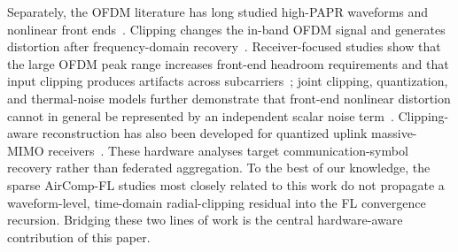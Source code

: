 \documentclass[journal]{IEEEtran}
\newcommand{\rev}[1]{{\color{revisionred}#1}}
\begin{document}
	Separately, the OFDM literature has long studied high-PAPR waveforms and nonlinear front ends~\cite{han2005overview}. Clipping changes the in-band OFDM signal and generates distortion after frequency-domain recovery~\cite{li1998effects}. Receiver-focused studies show that the large OFDM peak range increases front-end headroom requirements and that input clipping produces artifacts across subcarriers~\cite{rietman2008peak}; joint clipping, quantization, and thermal-noise models further demonstrate that front-end nonlinear distortion cannot in general be represented by an independent scalar noise term~\cite{dardari2006joint}. Clipping-aware reconstruction has also been developed for quantized uplink massive-MIMO receivers~\cite{kolomvakis2020reconstruction}. These hardware analyses target communication-symbol recovery rather than federated aggregation. \rev{To the best of our knowledge, the sparse AirComp-FL studies most closely related to this work do not propagate a waveform-level, time-domain radial-clipping residual into the FL convergence recursion. Bridging these two lines of work is the central hardware-aware contribution of this paper.}
\end{document}
